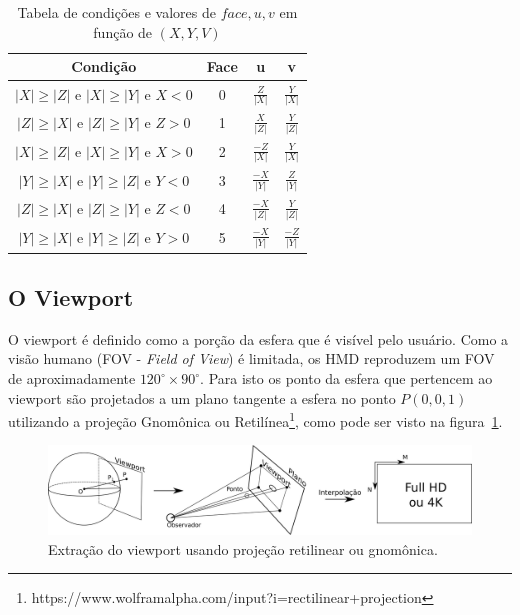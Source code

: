 {\begin{table}[htbp]
	\centering
	\caption{Tabela de condições e valores de \( face, u, v \) em função de $(X, Y, V)$}
	\label{tab:condicoes}
	\begin{tabular}{|c|c|c|c|}
		\hline
		\textbf{Condição} & \textbf{Face} & \textbf{u} & \textbf{v} \\
		\hline
		$ |X| \geq |Z|  \text{ e }  |X| \geq |Y|  \text{ e }  X < 0 $ & 0 &  $\frac{Z}{|X|}$ & $ \frac{Y}{|X|} $ \\
		$ |Z| \geq |X|  \text{ e }  |Z| \geq |Y|  \text{ e }  Z > 0 $ & 1 &  $\frac{X}{|Z|}$ & $ \frac{Y}{|Z|} $ \\
		$ |X| \geq |Z|  \text{ e }  |X| \geq |Y|  \text{ e }  X > 0 $ & 2 &  $\frac{-Z}{|X|}$  & $ \frac{Y}{|X|} $ \\
		$ |Y| \geq |X|  \text{ e }  |Y| \geq |Z|  \text{ e }  Y < 0 $ & 3 &  $\frac{-X}{|Y|} $ & $ \frac{Z}{|Y|} $ \\
		$ |Z| \geq |X|  \text{ e }  |Z| \geq |Y|  \text{ e }  Z < 0 $ & 4 &  $\frac{-X}{|Z|}$  & $ \frac{Y}{|Z|} $ \\
		$ |Y| \geq |X|  \text{ e }  |Y| \geq |Z|  \text{ e }  Y > 0 $ & 5 &  $\frac{-X}{|Y|}$  & $ \frac{-Z}{|Y|} $ \\
		\hline
	\end{tabular}
\end{table}


\subsection{O Viewport}

O viewport é definido como a porção da esfera que é visível pelo usuário. Como a visão humano (FOV -\textit{ Field of View}) é limitada, os HMD reproduzem um FOV de aproximadamente $120^\circ\times90^\circ$. Para isto os ponto da esfera que pertencem ao viewport são projetados a um plano tangente a esfera no ponto $ P(0, 0, 1) $ utilizando a projeção Gnomônica ou Retilínea\footnote{https://www.wolframalpha.com/input?i=rectilinear+projection}, como pode ser visto na figura~\ref{fig:projecao_viewport}. 

\begin{figure}[htb]
        \centering
        \includegraphics[width=1.0\linewidth]{fig/projecao_viewport.png}
        \caption{Extração do viewport usando projeção retilinear ou gnomônica.}
        \label{fig:projecao_viewport}
\end{figure}

}
